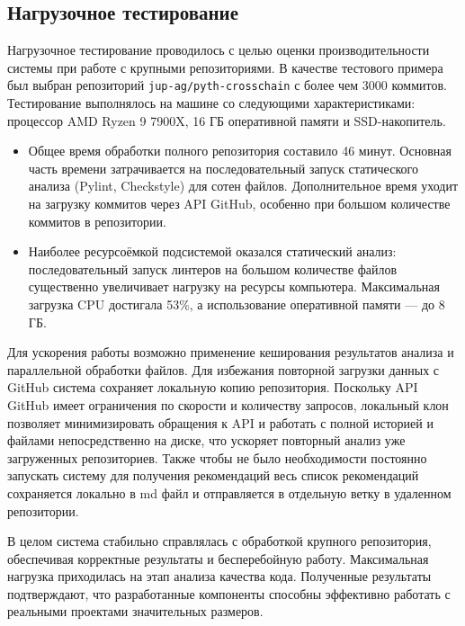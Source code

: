 \begin{itemize}
\section{Нагрузочное тестирование}

Нагрузочное тестирование проводилось с целью оценки производительности системы при работе с крупными репозиториями. В качестве тестового примера был выбран репозиторий \texttt{jup-ag/pyth-crosschain} с более чем 3000 коммитов. Тестирование выполнялось на машине со следующими характеристиками: процессор AMD Ryzen 9 7900X, 16 ГБ оперативной памяти и SSD-накопитель.

\begin{itemize}
	\item Общее время обработки полного репозитория составило 46 минут. Основная часть времени затрачивается на последовательный запуск статического анализа (Pylint, Checkstyle) для сотен файлов. Дополнительное время уходит на загрузку коммитов через API GitHub, особенно при большом количестве коммитов в репозитории.
	
	\item Наиболее ресурсоёмкой подсистемой оказался статический анализ: последовательный запуск линтеров на большом количестве файлов существенно увеличивает нагрузку на ресурсы компьютера. Максимальная загрузка CPU достигала 53\%, а использование оперативной памяти — до 8 ГБ.
\end{itemize}
Для ускорения работы возможно применение кеширования результатов анализа и параллельной обработки файлов. Для избежания повторной загрузки данных с GitHub система сохраняет локальную копию репозитория. Поскольку API GitHub имеет ограничения по скорости и количеству запросов, локальный клон позволяет минимизировать обращения к API и работать с полной историей и файлами непосредственно на диске, что ускоряет повторный анализ уже загруженных репозиториев. Также чтобы не было необходимости постоянно запускать систему для получения рекомендаций весь список рекомендаций сохраняется локально в md файл и отправляется в отдельную ветку в удаленном репозитории.


В целом система стабильно справлялась с обработкой крупного репозитория, обеспечивая корректные результаты и бесперебойную работу. Максимальная нагрузка приходилась на этап анализа качества кода. Полученные результаты подтверждают, что разработанные компоненты способны эффективно работать с реальными проектами значительных размеров.


\end{itemize}
